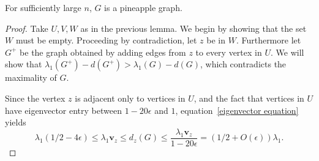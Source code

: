 \begin{theorem}
For sufficiently large $n$, $G$ is a pineapple graph.
\end{theorem}
\begin{proof}
  Take $U,V,W$ as in the previous lemma.  We begin by showing that the set $W$ must be empty.
  Proceeding by contradiction, let $z$ be in $W$.  Furthermore
let $G^+$ be the graph obtained by adding edges from $z$ to every vertex in $U$.
We will show that $\lambda_1(G^+) - d(G^+) > \lambda_1(G) - d(G)$, which contradicts the maximality of $G$.

Since the vertex $z$ is adjacent only to vertices in $U$, and the
fact that vertices in $U$ have eigenvector entry between $1-20\epsilon$ and $1$,
equation~\eqref{eigenvector equation} yields
 \[\lambda_1 (1/2 - 4 \epsilon) \leq \lambda_1 \mathbf{v}_z \leq d_z(G) \leq \frac{\lambda_1 \mathbf{v}_z}{1 - 20 \epsilon} = (1/2 + O(\epsilon))\lambda_1 .\]


\end{proof}
